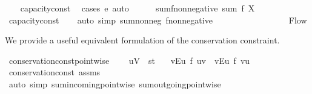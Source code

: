 \begin{isabellebody}
%
\isadelimproof
\ \ %
\endisadelimproof
%
\isatagproof
{}\isamarkupfalse%
\ capacity{\isacharunderscore}const\ \isamarkupfalse%
\ {\isacharparenleft}cases\ e{\isacharparenright}\ auto%
\endisatagproof
{\isafoldproof}%
%
\isadelimproof
\isanewline
%
\endisadelimproof
\ \ \ \ \isanewline
{}\isamarkupfalse%
\ sum{\isacharunderscore}f{\isacharunderscore}non{\isacharunderscore}negative{\isacharcolon}\ {\isachardoublequoteopen}sum\ f\ X\ {\isasymge}\ {}{\isachardoublequoteclose}%
\isadelimproof
\ %
\endisadelimproof
%
\isatagproof
{}\isamarkupfalse%
\ capacity{\isacharunderscore}const\isanewline
\ \ \isamarkupfalse%
\ {\isacharparenleft}auto\ simp{\isacharcolon}\ sum{\isacharunderscore}nonneg\ f{\isacharunderscore}non{\isacharunderscore}negative{\isacharparenright}%
\endisatagproof
{\isafoldproof}%
%
\isadelimproof
%
\endisadelimproof
\ \isanewline
\ \ \ \ \isanewline
{}\isamarkupfalse%
\ %
\ \ \ \isanewline
\ \ \ \ \isanewline
{}\isamarkupfalse%
\ Flow\isanewline
{}%
\begin{isamarkuptext}%
We provide a useful equivalent formulation of the 
  conservation constraint.%
\end{isamarkuptext}\isamarkuptrue%
\isamarkupfalse%
\ conservation{\isacharunderscore}const{\isacharunderscore}pointwise{\isacharcolon}\ \isanewline
\ \ \ {\isachardoublequoteopen}u{\isasymin}V\ {\isacharminus}\ {\isacharbraceleft}s{\isacharcomma}t{\isacharbraceright}{\isachardoublequoteclose}\isanewline
\ \ \ {\isachardoublequoteopen}{\isacharparenleft}{\isasymSum}v{\isasymin}E{\isacharbackquote}{\isacharbackquote}{\isacharbraceleft}u{\isacharbraceright}{\isachardot}\ f\ {\isacharparenleft}u{\isacharcomma}v{\isacharparenright}{\isacharparenright}\ {\isacharequal}\ {\isacharparenleft}{\isasymSum}v{\isasymin}E{\isasyminverse}{\isacharbackquote}{\isacharbackquote}{\isacharbraceleft}u{\isacharbraceright}{\isachardot}\ f\ {\isacharparenleft}v{\isacharcomma}u{\isacharparenright}{\isacharparenright}{\isachardoublequoteclose}\isanewline
%
\isadelimproof
\ \ %
\endisadelimproof
%
\isatagproof
{}\isamarkupfalse%
\ conservation{\isacharunderscore}const\ assms\isanewline
\ \ \isamarkupfalse%
\ {\isacharparenleft}auto\ simp{\isacharcolon}\ sum{\isacharunderscore}incoming{\isacharunderscore}pointwise\ sum{\isacharunderscore}outgoing{\isacharunderscore}pointwise{\isacharparenright}%
\endisatagproof

\end{isabellebody}
